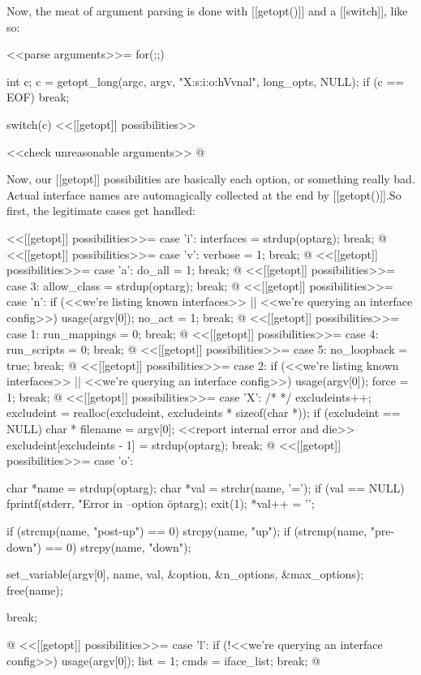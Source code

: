 \documentclass{article}
\begin{document}
Now, the meat of argument parsing is done with [[getopt()]] and a
[[switch]], like so:

<<parse arguments>>=
for(;;) {
	int c;
	c = getopt_long(argc, argv, "X:s:i:o:hVvnal", long_opts, NULL);
	if (c == EOF) break;

	switch(c) {
		<<[[getopt]] possibilities>>
	}
}

<<check unreasonable arguments>>
@ 

Now, our [[getopt]] possibilities are basically each option, or something
really bad. Actual interface names are automagically collected at the end
by [[getopt()]].So first, the legitimate cases get handled:

<<[[getopt]] possibilities>>=
case 'i':
	interfaces = strdup(optarg);
	break;
@ 
<<[[getopt]] possibilities>>=
case 'v':
	verbose = 1;
	break;
@ 
<<[[getopt]] possibilities>>=
case 'a':
	do_all = 1;
	break;
@ 
<<[[getopt]] possibilities>>=
case 3:
	allow_class = strdup(optarg);
	break;
@ 
<<[[getopt]] possibilities>>=
case 'n':
        if (<<we're listing known interfaces>> || <<we're querying an interface config>>)
		usage(argv[0]);
	no_act = 1;
	break;
@ 
<<[[getopt]] possibilities>>=
case 1:
	run_mappings = 0;
	break;
@ 
<<[[getopt]] possibilities>>=
case 4:
	run_scripts = 0;
	break;
@ 
<<[[getopt]] possibilities>>=
case 5:
	no_loopback = true;
	break;
@ 
<<[[getopt]] possibilities>>=
case 2:
        if (<<we're listing known interfaces>> || <<we're querying an interface config>>)
		usage(argv[0]);
	force = 1;
	break;
@
<<[[getopt]] possibilities>>=
case 'X':
	/* */
	excludeints++;
	excludeint = realloc(excludeint, excludeints * sizeof(char *));
	if (excludeint == NULL) {
		char * filename = argv[0];
		<<report internal error and die>>
	}
	excludeint[excludeints - 1] = strdup(optarg);
	break;
@ 
<<[[getopt]] possibilities>>=
case 'o':
{
	char *name = strdup(optarg);
	char *val = strchr(name, '=');
	if (val == NULL) {
		fprintf(stderr, "Error in --option \"%
			optarg);
		exit(1);
	}
	*val++ = '\0';

	if (strcmp(name, "post-up") == 0) {
		strcpy(name, "up");
	}
	if (strcmp(name, "pre-down") == 0) {
		strcpy(name, "down");
	}
	
	set_variable(argv[0], name, val, &option, &n_options, &max_options);
	free(name);

	break;
}
@ 
<<[[getopt]] possibilities>>=
case 'l':
        if (!<<we're querying an interface config>>)
		usage(argv[0]);
	list = 1;
	cmds = iface_list;
	break;
@ 
\end{document}
